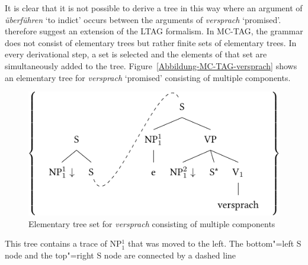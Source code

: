 It is clear that it is not possible to derive a tree in this way where an argument of \emph{überführen} `to indict' occurs between the arguments of \emph{versprach}
`promised'. \citet*{JBR2000a} therefore suggest an extension of the LTAG formalism. In MC-TAG, the grammar does not consist of elementary trees but rather
finite sets of elementary trees. In every derivational step, a set is selected and the elements of that set are simultaneously added to the tree.
Figure~\vref{Abbildung-MC-TAG-versprach} shows an elementary tree for \emph{versprach} `promised' consisting of multiple components.
\begin{figure}
\includegraphics{Figures/tag-versprach-lsp-crop}
\caption{\label{Abbildung-MC-TAG-versprach}Elementary tree set for \emph{versprach} consisting of multiple components}
\end{figure}%
This tree contains a trace of NP$_1^1$ that was moved to the left. The bottom"=left S node and the top"=right S node are connected by a dashed line
